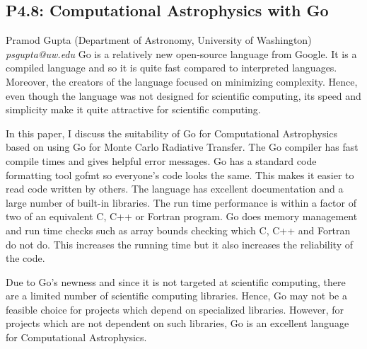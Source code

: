 \documentclass{report}
\begin{document}
\subsection*{P4.8: Computational Astrophysics with Go}
\bigskip
Pramod Gupta (Department of Astronomy, University of Washington) \newline   \newline   \newline   \newline  \newline  \newline\newline
{\it psgupta@uw.edu}\newline
\newline\newline
Go is a relatively new open-source language from Google. It is a compiled language and so it is quite fast compared to interpreted languages. Moreover, the creators of the language focused on minimizing  complexity. Hence, even though the language was not designed for scientific computing, its speed and simplicity make it quite attractive for scientific computing. 

In this paper, I discuss the suitability of Go for Computational Astrophysics based on using Go for Monte Carlo Radiative Transfer.
 The Go compiler has fast compile times and gives helpful error messages. Go has a standard code formatting tool gofmt so everyone's code looks the same. This makes it easier to read code written by others. The language has excellent documentation and a large number of built-in libraries. The run time performance is within a factor of two of an equivalent C, C++ or Fortran program. Go does memory management and run time checks such as array bounds checking which C, C++ and Fortran do not do. This increases the running time but it also increases the reliability of the code.


Due to Go's newness and since it is not targeted at scientific computing, there are a limited number of scientific computing libraries.  Hence, Go may not be a feasible choice for projects which depend on specialized libraries. However, for projects which are not dependent on such libraries, Go is an excellent language for Computational Astrophysics.\newline
\newpage
\end{document}
